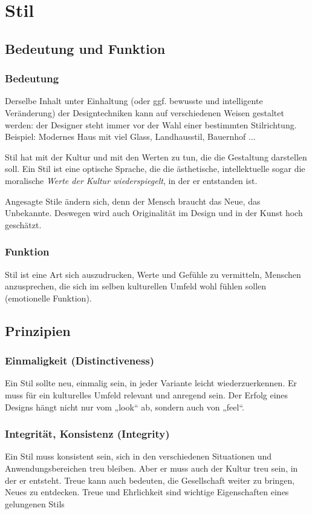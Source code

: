 \section{Stil}

\subsection{Bedeutung und Funktion}
\subsubsection*{Bedeutung}
Derselbe Inhalt unter Einhaltung (oder ggf. bewusste und intelligente Veränderung) der Designtechniken kann auf verschiedenen Weisen gestaltet werden: der Designer steht immer vor der Wahl einer bestimmten Stilrichtung. 
Beispiel: Modernes Haus mit viel Glass, Landhausstil, Bauernhof ...

Stil hat mit der Kultur und mit den Werten zu tun, die die Gestaltung darstellen soll. Ein Stil ist eine optische Sprache, die die ästhetische, intellektuelle  sogar die moralische \emph{Werte der Kultur wiederspiegelt}, in der er entstanden ist.

Angesagte Stile ändern sich, denn der Mensch braucht das Neue, das Unbekannte. Deswegen wird auch Originalität im Design und in der Kunst hoch geschätzt. 
 
\subsubsection*{Funktion}
Stil ist eine Art sich auszudrucken, Werte und Gefühle zu vermitteln, Menschen anzusprechen, die sich im selben kulturellen Umfeld wohl fühlen sollen (emotionelle Funktion).

\subsection{Prinzipien}
\subsubsection*{Einmaligkeit (Distinctiveness)}
Ein Stil sollte neu, einmalig sein, in jeder Variante leicht wiederzuerkennen. Er muss für ein kulturelles Umfeld relevant und anregend sein. Der Erfolg eines Designs hängt nicht nur vom „look“ ab, sondern auch von „feel“. 
 
\subsubsection*{Integrität, Konsistenz (Integrity)}
Ein Stil muss konsistent sein, sich in den verschiedenen Situationen und Anwendungsbereichen treu bleiben. Aber er muss auch der Kultur treu sein, in der er entsteht. Treue kann auch bedeuten, die Gesellschaft weiter zu bringen, Neues zu entdecken. Treue und Ehrlichkeit sind wichtige Eigenschaften eines gelungenen Stils
 

